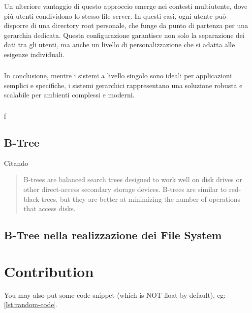 \documentclass[12pt,a4paper,openright,twoside]{book}
\begin{document}
        Un ulteriore vantaggio di questo approccio emerge nei contesti multiutente, dove più utenti condividono lo stesso file server. In questi casi, ogni utente può disporre di una directory root personale, che funge da punto di partenza per una gerarchia dedicata. Questa configurazione garantisce non solo la separazione dei dati tra gli utenti, ma anche un livello di personalizzazione che si adatta alle esigenze individuali.

    \paragraph*{}

        In conclusione, mentre i sistemi a livello singolo sono ideali per applicazioni semplici e specifiche, i sistemi gerarchici rappresentano una soluzione robusta e scalabile per ambienti complessi e moderni.

    \paragraph*{}

        f

    \section{B-Tree}

        Citando
        \begin{quote}
            B-trees are balanced search trees designed to work well on disk drives or other direct-access secondary storage devices. B-trees are similar to red-black trees, but they are better at minimizing the number of operations that access disks.
        \end{quote}

    \section{B-Tree nella realizzazione dei File System}

\chapter{Contribution}

You may also put some code snippet (which is NOT float by default), eg: \cref{lst:random-code}.


\end{document}
